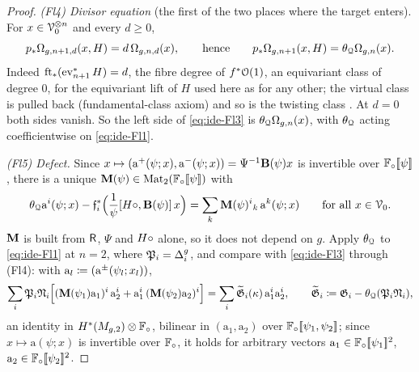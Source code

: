 \begin{proof}
\emph{(Fl4) Divisor equation} (the first of the two places where the target enters). For $x\in\mathcal{V}_0^{\otimes n}$ and every $d\geq 0$,
\[
p_*\Omega_{g,n+1,d}(x,H)=d\,\Omega_{g,n,d}(x),\qquad\text{hence}\qquad p_*\Omega_{g,n+1}(x,H)=\theta_{\mathcal{Q}}\Omega_{g,n}(x).
\]
Indeed $\mathrm{ft}_*(\operatorname{ev}_{n+1}^*H)=d$, the fibre degree of $f^*\mathcal{O}(1)$, an equivariant class of degree $0$, for the equivariant lift of $H$ used here as for any other; the virtual class is pulled back (fundamental-class axiom) and so is the twisting class \cite[App.~1~(iv)]{CG07}. At $d=0$ both sides vanish. So the left side of \cref{eq:ide-Fl3} is $\theta_{\mathcal{Q}}\Omega_{g,n}(x)$, with $\theta_{\mathcal{Q}}$ acting coefficientwise on \cref{eq:ide-Fl1}.

\emph{(Fl5) Defect.} Since $x\mapsto(\mathrm{a}^{+}(\psi;x),\mathrm{a}^{-}(\psi;x))=\Psi^{-1}\mathbf{B}(\psi)x$ is invertible over $\mathbb{F}_{\circ}[\![ \psi ]\!]$, there is a unique $\mathbf{M}(\psi)\in\mathrm{Mat}_2(\mathbb{F}_{\circ}[\![ \psi ]\!])$ with
\[
\theta_{\mathcal{Q}}\mathrm{a}^{i}(\psi;x)-\mathfrak{f}_i^*\Big(\frac{1}{\psi}[H\circ,\mathbf{B}(\psi)]\,x\Big)=\sum_k\mathbf{M}(\psi)^i{}_k\,\mathrm{a}^{k}(\psi;x)\qquad\text{for all }x\in\mathcal{V}_0 .
\]
$\mathbf{M}$ is built from $\mathsf{R}$, $\Psi$ and $H\circ$ alone, so it does not depend on $g$. Apply $\theta_{\mathcal{Q}}$ to \cref{eq:ide-Fl1} at $n=2$, where $\mathfrak{P}_i=\Delta_i^g$, and compare with \cref{eq:ide-Fl3} through (Fl4): with $\mathrm{a}_l\coloneqq(\mathrm{a}^{\pm}(\psi_l;x_l))$,
\begin{equation}
\label{eq:ide-Fl5}
\sum_i\mathfrak{P}_i\mathfrak{N}_i\Big[(\mathbf{M}(\psi_1)\mathrm{a}_1)^i\,\mathrm{a}_2^i+\mathrm{a}_1^i\,(\mathbf{M}(\psi_2)\mathrm{a}_2)^i\Big]=\sum_i\widetilde{\mathfrak{G}}_i(\kappa)\,\mathrm{a}_1^i\mathrm{a}_2^i,\qquad
\widetilde{\mathfrak{G}}_i\coloneqq\mathfrak{G}_i-\theta_{\mathcal{Q}}(\mathfrak{P}_i\mathfrak{N}_i),
\end{equation}
an identity in $H^*(M_{g,2})\otimes\mathbb{F}_{\circ}$, bilinear in $(\mathrm{a}_1,\mathrm{a}_2)$ over $\mathbb{F}_{\circ}[\![ \psi_1,\psi_2 ]\!]$; since $x\mapsto\mathrm{a}(\psi;x)$ is invertible over $\mathbb{F}_{\circ}$, it holds for arbitrary vectors $\mathrm{a}_1\in\mathbb{F}_{\circ}[\![ \psi_1 ]\!]^2$, $\mathrm{a}_2\in\mathbb{F}_{\circ}[\![ \psi_2 ]\!]^2$.


\end{proof}
